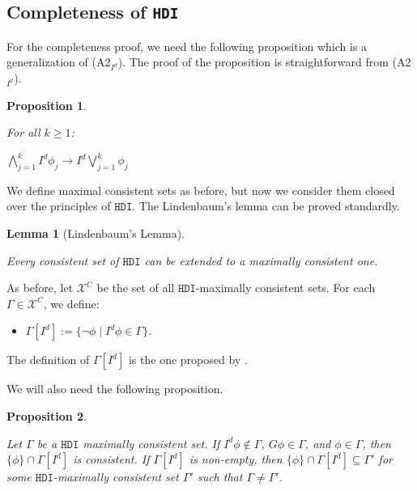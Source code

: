 \documentclass{article}
\newtheorem{prop}{Proposition}
\newtheorem{lemma}{Lemma}
\begin{document}
\subsection{Completeness of \texttt{HDI}}
\label{appHDIcomplete}


For the completeness proof, we need the following proposition which is a generalization of (A2$_{I^{d}}$). The proof of the proposition is straightforward from (A2$_{I^{d}}$).

\begin{prop}
\label{useful7}

For all $k \geq 1$:

\begin{center}

$\bigwedge^{k}_{j=1} I^{d} \phi_{j} \rightarrow I^{d} \bigvee^{k}_{j=1} \phi_{j}$

\end{center}

\end{prop}

We define maximal consistent sets as before, but now we consider them closed over the principles of $\mathtt{HDI}$. The Lindenbaum's lemma can be proved standardly.

\begin{lemma}[Lindenbaum's Lemma]
\label{LindID}

Every consistent set of $\mathtt{HDI}$ can be extended to a maximally consistent one.

\end{lemma}


As before, let $\mathcal{X}^{C}$ be the set of all $\mathtt{HDI}$-maximally consistent sets. For each $\Gamma \in \mathcal{X}^{C}$, we define:

\begin{itemize}

\item $\Gamma[I^{d}] := \{ \neg \phi \mid I^{d} \phi \in \Gamma\}$.

\end{itemize}

The definition of $\Gamma[I^{d}]$ is the one proposed by \citet{Gilbert2021}.

We will also need the following proposition.

\begin{prop}
\label{useful8}

Let $\Gamma$ be a $\mathtt{HDI}$ maximally consistent set. If $I^{d} \phi \not \in \Gamma$,  $G\phi \in \Gamma$, and $\phi \in \Gamma$, then $\{\phi\} \cap \Gamma[I^{d}]$ is consistent. If $\Gamma[I^{d}]$ is non-empty, then $\{\phi\} \cap \Gamma[I^{d}] \subseteq \Gamma'$ for some $\mathtt{HDI}$-maximally consistent set $\Gamma'$ such that $\Gamma \not = \Gamma'$.

\end{prop}
\end{document}
